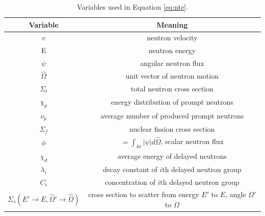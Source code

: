 \documentclass[12pt]{article}
\begin{document}
\linespread{1}
\begin{table}[h]
\caption{Variables used in Equation \ref{eq:nte}.}
\centering
\begin{tabular}{c|c}
Variable & Meaning \\
\hline
$v$ & neutron velocity \\
E & neutron energy \\
$\psi$ & angular neutron flux \\
$\hat{\Omega}$ & unit vector of neutron motion \\
$\Sigma_t$ & total neutron cross section \\
$\chi_p$ & energy distribution of prompt neutrons \\
$\nu_p$ & average number of produced prompt neutrons \\
$\Sigma_f$ & nuclear fission cross section \\
$\phi$ & $=\int_{4\pi} |\psi| d\hat{\Omega}$, scalar neutron flux \\
$\chi_d$ & average energy of delayed neutrons \\
$\lambda_i$ & decay constant of $i$th delayed neutron group \\
$C_i$ & concentration of $i$th delayed neutron group \\
$\Sigma_s(E'\rightarrow E,\hat{\Omega}'\rightarrow \hat{\Omega})$ & cross section to scatter from energy $E'$ to $E$, angle $\Omega'$ to $\Omega$ \\
\end{tabular}
\end{table}
\linespread{2}
\end{document}
